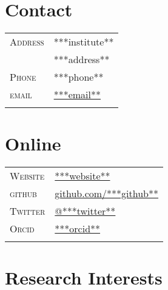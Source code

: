 \documentclass[10pt]{article}
\begin{document}
\pagestyle{empty}


\par{\bigskip\par}



\begin{multicols}{2}
\setlength{\parskip}{0pt}
%
\section{Contact}
\begin{tabularx}{\linewidth}{@{}l X@{}}
  \textsc{Address} & \small{***institute**} \\
                   & \small{***address**} \\
  \textsc{Phone}   & \small{***phone**}\\
  \textsc{email}   & \href{mailto:***email**}{***email**} \\
  \\
\end{tabularx}

\vfill
\columnbreak

\section{Online}
\begin{tabularx}{\linewidth}{@{}l X@{}}
  \textsc{Website}  & \href{***websiteescaped**}{***website**} \\
  \textsc{github}   & \href{http://www.github.com/***github**}{github.com/***github**}\\
  \textsc{Twitter}  & \href{https://twitter.com/***twitter**}{@***twitter**} \\
  \textsc{Orcid}    & \href{http://orcid.org/***orcid**}{***orcid**} \\
  \\
\end{tabularx}

\end{multicols}

\vspace{-2em}
\section{Research Interests}
\end{document}
